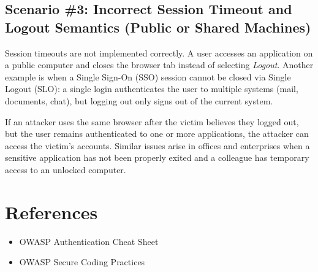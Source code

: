 \documentclass[11pt]{article}
\begin{document}
\subsection{Scenario \#3: Incorrect Session Timeout and Logout Semantics (Public or Shared Machines)}
Session timeouts are not implemented correctly. A user accesses an application on a public computer and closes the browser tab instead of selecting \textit{Logout}. Another example is when a Single Sign-On (SSO) session cannot be closed via Single Logout (SLO): a single login authenticates the user to multiple systems (mail, documents, chat), but logging out only signs out of the current system.

If an attacker uses the same browser after the victim believes they logged out, but the user remains authenticated to one or more applications, the attacker can access the victim’s accounts. Similar issues arise in offices and enterprises when a sensitive application has not been properly exited and a colleague has temporary access to an unlocked computer.

\section{References}
\begin{itemize}
  \item OWASP Authentication Cheat Sheet
  \item OWASP Secure Coding Practices
\end{itemize}

\newpage
\end{document}
